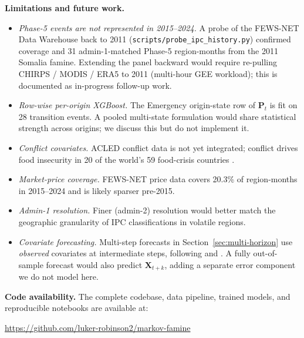 \documentclass[11pt,letterpaper]{article}
\begin{document}
\noindent \textbf{Limitations and future work.}
\begin{itemize}
  \item \emph{Phase-5 events are not represented in 2015--2024.} A probe of the FEWS-NET Data Warehouse back to 2011 (\texttt{scripts/probe\_ipc\_history.py}) confirmed coverage and 31 admin-1-matched Phase-5 region-months from the 2011 Somalia famine. Extending the panel backward would require re-pulling CHIRPS / MODIS / ERA5 to 2011 (multi-hour GEE workload); this is documented as in-progress follow-up work.
  \item \emph{Row-wise per-origin XGBoost.} The Emergency origin-state row of $\mathbf{P}_t$ is fit on 28 transition events. A pooled multi-state formulation \citep{bartolucci2019, meiramachado2009} would share statistical strength across origins; we discuss this but do not implement it.
  \item \emph{Conflict covariates.} ACLED conflict data is not yet integrated; conflict drives food insecurity in 20 of the world's 59 food-crisis countries \citep{ocha2023}.
  \item \emph{Market-price coverage.} FEWS-NET price data covers 20.3\% of region-months in 2015--2024 and is likely sparser pre-2015.
  \item \emph{Admin-1 resolution.} Finer (admin-2) resolution would better match the geographic granularity of IPC classifications in volatile regions.
  \item \emph{Covariate forecasting.} Multi-step forecasts in Section~\ref{sec:multi-horizon} use \emph{observed} covariates at intermediate steps, following \citet{busker2024} and \citet{westerveld2021}. A fully out-of-sample forecast would also predict $\mathbf{X}_{t+k}$, adding a separate error component we do not model here.
\end{itemize}

\medskip

\noindent \textbf{Code availability.} The complete codebase, data pipeline, trained models, and reproducible notebooks are available at:

\begin{center}
\url{https://github.com/luker-robinson2/markov-famine}
\end{center}
\end{document}
